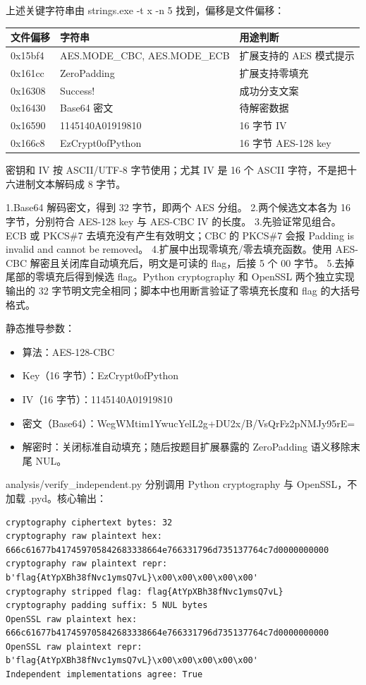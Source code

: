上述关键字符串由 strings.exe -t x -n 5 找到，偏移是文件偏移：

{\def\LTcaptype{} %
\begin{longtable}[]{@{}lll@{}}
\toprule\noalign{}
文件偏移 & 字符串 & 用途判断 \\
\midrule\noalign{}
\endhead
\bottomrule\noalign{}
\endlastfoot
0x15bf4 & AES.MODE\_CBC, AES.MODE\_ECB & 扩展支持的 AES 模式提示 \\
0x161cc & ZeroPadding & 扩展支持零填充 \\
0x16308 & Success! & 成功分支文案 \\
0x16430 & Base64 密文 & 待解密数据 \\
0x16590 & 1145140A01919810 & 16 字节 IV \\
0x166c8 & EzCrypt0ofPython & 16 字节 AES-128 key \\
\end{longtable}
}

密钥和 IV 按 ASCII/UTF-8 字节使用；尤其 IV 是 16 个 ASCII 字符，不是把十六进制文本解码成 8 字节。

1.Base64 解码密文，得到 32 字节，即两个 AES 分组。 2.两个候选文本各为 16 字节，分别符合 AES-128 key 与 AES-CBC IV 的长度。 3.先验证常见组合。ECB 或 PKCS\#7 去填充没有产生有效明文；CBC 的 PKCS\#7 会报 Padding is invalid and cannot be removed。 4.扩展中出现零填充/零去填充函数。使用 AES-CBC 解密且关闭库自动填充后，明文是可读的 flag，后接 5 个 00 字节。 5.去掉尾部的零填充后得到候选 flag。Python cryptography 和 OpenSSL 两个独立实现输出的 32 字节明文完全相同；脚本中也用断言验证了零填充长度和 flag 的大括号格式。

静态推导参数：

\begin{itemize}
\tightlist
\item
  算法：AES-128-CBC
\item
  Key（16 字节）：EzCrypt0ofPython
\item
  IV（16 字节）：1145140A01919810
\item
  密文（Base64）：WegWMtim1YwucYelL2g+DU2x/B/VsQrFz2pNMJy95rE=
\item
  解密时：关闭标准自动填充；随后按题目扩展暴露的 ZeroPadding 语义移除末尾 NUL。
\end{itemize}

analysis/verify\_independent.py 分别调用 Python cryptography 与 OpenSSL，不加载 .pyd。核心输出：

\begin{verbatim}
cryptography ciphertext bytes: 32
cryptography raw plaintext hex: 666c61677b417459705842683338664e766331796d735137764c7d0000000000
cryptography raw plaintext repr: b'flag{AtYpXBh38fNvc1ymsQ7vL}\x00\x00\x00\x00\x00'
cryptography stripped flag: flag{AtYpXBh38fNvc1ymsQ7vL}
cryptography padding suffix: 5 NUL bytes
OpenSSL raw plaintext hex: 666c61677b417459705842683338664e766331796d735137764c7d0000000000
OpenSSL raw plaintext repr: b'flag{AtYpXBh38fNvc1ymsQ7vL}\x00\x00\x00\x00\x00'
Independent implementations agree: True
\end{verbatim}

